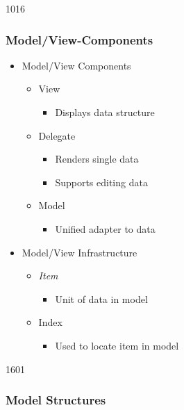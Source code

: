 \begin{slide}{1016}\frametitle{Model/View-Components}\label{model_view_concepts}
  \begin{itemize}
  \item Model/View Components
    \begin{itemize}
    \item View
      \begin{itemize}
        \item Displays data structure
      \end{itemize}
    \item Delegate
      \begin{itemize}
        \item Renders single data
        \item Supports editing data
      \end{itemize}
      \item Model
      \begin{itemize}
        \item Unified adapter to data
      \end{itemize}
    \end{itemize}
  \item Model/View Infrastructure
    \begin{itemize}
    \item \textit{Item}
      \begin{itemize}
        \item Unit of data in model
      \end{itemize}
    \item Index
      \begin{itemize}
        \item Used to locate item in model
      \end{itemize}
    \end{itemize}
  \end{itemize}
  
\smallskip
{}
  
\end{slide}

\begin{slide}{1601}\frametitle{Model Structures}
\vspace*{20mm}
\end{slide}


